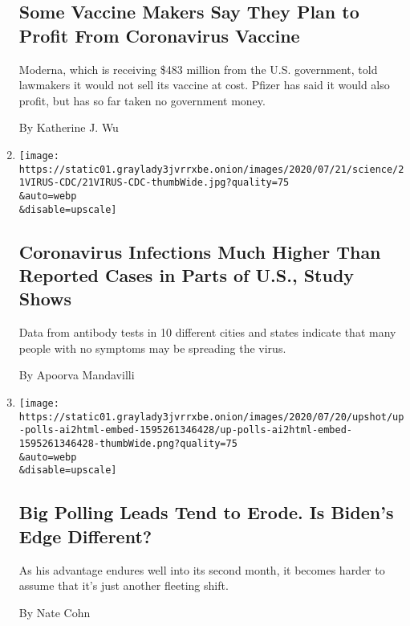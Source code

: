 \begin{enumerate}
  \hypertarget{some-vaccine-makers-say-they-plan-to-profit-from-coronavirus-vaccine}{%
  \subsection{Some Vaccine Makers Say They Plan to Profit From
  Coronavirus
  Vaccine}\label{some-vaccine-makers-say-they-plan-to-profit-from-coronavirus-vaccine}}

  Moderna, which is receiving \$483 million from the U.S. government,
  told lawmakers it would not sell its vaccine at cost. Pfizer has said
  it would also profit, but has so far taken no government money.

  By Katherine J. Wu
\item
  \href{/2020/07/21/health/coronavirus-infections-us.html}{}

  \texttt{[image: https://static01.graylady3jvrrxbe.onion/images/2020/07/21/science/21VIRUS-CDC/21VIRUS-CDC-thumbWide.jpg?quality=75\\\&auto=webp\\\&disable=upscale]}

  \hypertarget{coronavirus-infections-much-higher-than-reported-cases-in-parts-of-us-study-shows}{%
  \subsection{Coronavirus Infections Much Higher Than Reported Cases in
  Parts of U.S., Study
  Shows}\label{coronavirus-infections-much-higher-than-reported-cases-in-parts-of-us-study-shows}}

  Data from antibody tests in 10 different cities and states indicate
  that many people with no symptoms may be spreading the virus.

  By Apoorva Mandavilli
\item
  \href{/2020/07/20/upshot/biden-trump-poll.html}{}

  \texttt{[image: https://static01.graylady3jvrrxbe.onion/images/2020/07/20/upshot/up-polls-ai2html-embed-1595261346428/up-polls-ai2html-embed-1595261346428-thumbWide.png?quality=75\\\&auto=webp\\\&disable=upscale]}

  \hypertarget{big-polling-leads-tend-to-erode-is-bidens-edge-different}{%
  \subsection{Big Polling Leads Tend to Erode. Is Biden's Edge
  Different?}\label{big-polling-leads-tend-to-erode-is-bidens-edge-different}}

  As his advantage endures well into its second month, it becomes harder
  to assume that it's just another fleeting shift.

  By Nate Cohn
\end{enumerate}

